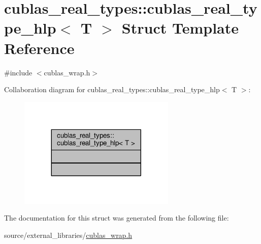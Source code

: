 \hypertarget{structcublas__real__types_1_1cublas__real__type__hlp}{\section{cublas\-\_\-real\-\_\-types\-:\-:cublas\-\_\-real\-\_\-type\-\_\-hlp$<$ T $>$ Struct Template Reference}
\label{structcublas__real__types_1_1cublas__real__type__hlp}
}


{\ttfamily \#include $<$cublas\-\_\-wrap.\-h$>$}



Collaboration diagram for cublas\-\_\-real\-\_\-types\-:\-:cublas\-\_\-real\-\_\-type\-\_\-hlp$<$ T $>$\-:
\nopagebreak
\begin{figure}[H]
\begin{center}
\leavevmode
\includegraphics[width=212pt]{structcublas__real__types_1_1cublas__real__type__hlp__coll__graph}
\end{center}
\end{figure}


The documentation for this struct was generated from the following file\-:\begin{DoxyCompactItemize}
\item 
source/external\-\_\-libraries/\hyperlink{cublas__wrap_8h}{cublas\-\_\-wrap.\-h}\end{DoxyCompactItemize}
